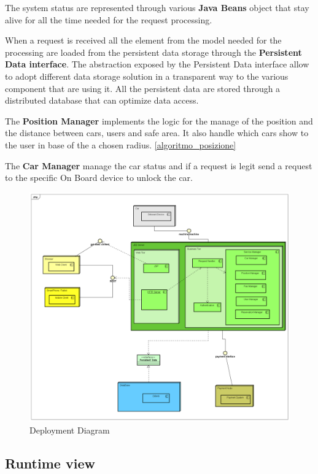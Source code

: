 The system status are represented through various \textbf{Java Beans} object that stay alive for all the time needed for the request processing.


When a request is received all the element from the model needed for the processing are loaded from the persistent data storage through the \textbf{Persistent Data interface}. The abstraction exposed by the Persistent Data interface allow to adopt different data storage solution in a transparent way to the various component that are using it. All the persistent data are stored through a distributed database that can optimize data access.

The \textbf{Position Manager} implements the logic for the manage of the position and the distance between cars, users and safe area. It also handle which cars show to the user in base of the a chosen radius. \ref{algoritmo_posizione}

The \textbf{Car Manager} manage the car status and if a request is legit send a request to the specific On Board device to unlock the car.



\begin{figure}[H]	
	\centering
	\includegraphics[width=\textwidth]{img/deployment_diagram}
	\caption{Deployment Diagram}
\end{figure}

\newpage

\subsection{Runtime view}



